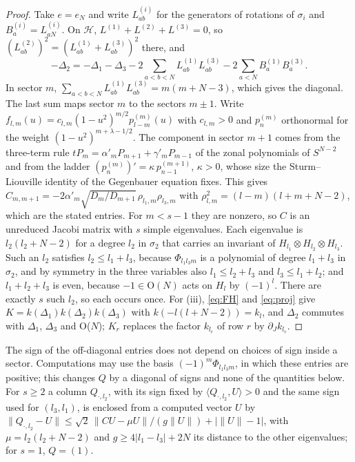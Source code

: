 \begin{proof}
Take $e=e_N$ and write $L^{(i)}_{ab}$ for the generators of rotations of $\sigma_i$ and $B^{(i)}_a=L^{(i)}_{aN}$. On $\mathcal H$,
$L^{(1)}+L^{(2)}+L^{(3)}=0$, so $(L^{(2)}_{ab})^2=(L^{(1)}_{ab}+L^{(3)}_{ab})^2$ there, and
\[
-\Delta_2=-\Delta_1-\Delta_3-2\sum_{a<b<N}L^{(1)}_{ab}L^{(3)}_{ab}-2\sum_{a<N}B^{(1)}_aB^{(3)}_a .
\]
In sector $m$, $\sum_{a<b<N}L^{(1)}_{ab}L^{(3)}_{ab}=m(m+N-3)$, which gives the diagonal. The last sum maps sector $m$ to the sectors $m\pm1$. Write
$f_{l,m}(u)=c_{l,m}(1-u^2)^{m/2}p^{(m)}_{l-m}(u)$ with $c_{l,m}>0$ and $p^{(m)}_n$ orthonormal for the weight $(1-u^2)^{m+\lambda-1/2}$. The component in
sector $m+1$ comes from the three-term rule $tP_m=\alpha'_mP_{m+1}+\gamma'_mP_{m-1}$ of the zonal polynomials of $S^{N-2}$ and from the ladder
$(p^{(m)}_n)'=\kappa\,p^{(m+1)}_{n-1}$, $\kappa>0$, whose size the Sturm--Liouville identity of the Gegenbauer equation fixes. This gives
$C_{m,m+1}=-2\alpha'_m\sqrt{D_m/D_{m+1}}\,\rho_{l_1,m}\rho_{l_3,m}$ with $\rho_{l,m}^2=(l-m)(l+m+N-2)$, which are the stated entries. For $m<s-1$ they
are nonzero, so $C$ is an unreduced Jacobi matrix with $s$ simple eigenvalues. Each eigenvalue is $l_2(l_2+N-2)$ for a degree $l_2$ in $\sigma_2$ that
carries an invariant of $H_{l_1}\otimes H_{l_2}\otimes H_{l_3}$. Such an $l_2$ satisfies $l_2\le l_1+l_3$, because $\Phi_{l_1l_3m}$ is a polynomial of
degree $l_1+l_3$ in $\sigma_2$, and by symmetry in the three variables also $l_1\le l_2+l_3$ and $l_3\le l_1+l_2$; and $l_1+l_2+l_3$ is even, because
$-1\in\mathrm O(N)$ acts on $H_l$ by $(-1)^l$. There are exactly $s$ such $l_2$, so each occurs once. For (iii), \eqref{eq:FH} and \eqref{eq:proj} give
$K=k(\Delta_1)k(\Delta_2)k(\Delta_3)$ with $k(-l(l+N-2))=k_l$, and $\Delta_2$ commutes with $\Delta_1$, $\Delta_3$ and O($N$); $K_r$ replaces the
factor $k_{l_r}$ of row $r$ by $\partial_Jk_{l_r}$.
\end{proof}

\noindent The sign of the off-diagonal entries does not depend on choices of sign inside a sector. Computations may use the basis $(-1)^m\Phi_{l_1l_3m}$,
in which these entries are positive; this changes $Q$ by a diagonal of signs and none of the quantities below. For $s\ge2$ a column $Q_{\cdot,l_2}$, with
its sign fixed by $\langle Q_{\cdot,l_2},U\rangle>0$ and the same sign used for $(l_3,l_1)$, is enclosed from a computed vector $U$ by
$\|Q_{\cdot,l_2}-U\|\le\sqrt2\,\|CU-\mu U\|/(g\|U\|)+|\|U\|-1|$, with $\mu=l_2(l_2+N-2)$ and $g\ge4|l_1-l_3|+2N$ its distance to the other eigenvalues;
for $s=1$, $Q=(1)$.

